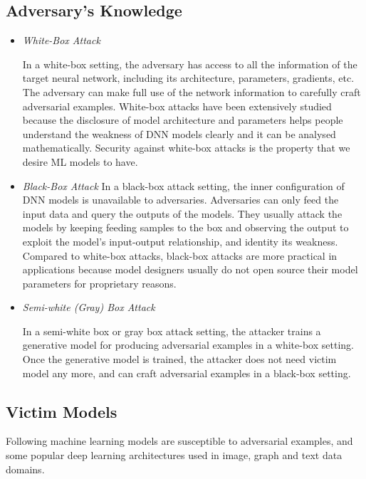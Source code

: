 		\subsection{Adversary's Knowledge}		
            \begin{itemize}
                \item \textit{White-Box Attack}
                
                In a white-box setting, the adversary has access to all the information of the target neural network, including its architecture, parameters, gradients, etc. The adversary can make full use of the network information to carefully craft adversarial examples. White-box attacks have been extensively studied because the disclosure of model architecture and parameters helps people understand the weakness of DNN models clearly and it can be analysed mathematically. Security against white-box attacks is the property that we desire ML models to have.
            
                \item \textit{Black-Box Attack}
                In a black-box attack setting, the inner configuration of DNN models is unavailable to adversaries. Adversaries can only feed the input data and query the outputs of the models. They usually attack the models by keeping feeding samples to the box and observing the output to exploit the model's input-output relationship, and identity its weakness. Compared to white-box attacks, black-box attacks are more practical in applications because model designers usually do not open source their model parameters for proprietary reasons.	
            
                \item \textit{Semi-white (Gray) Box Attack}	
                
                In a semi-white box or gray box attack setting, the attacker trains a generative model for producing adversarial examples in a white-box setting. Once the generative model is trained, the attacker does not need victim model any more, and can craft adversarial examples in a black-box setting.
            \end{itemize}
            
		\subsection{Victim Models}
    		Following machine learning models are susceptible to adversarial examples, and some popular deep learning architectures used in image, graph and text data domains.
		
